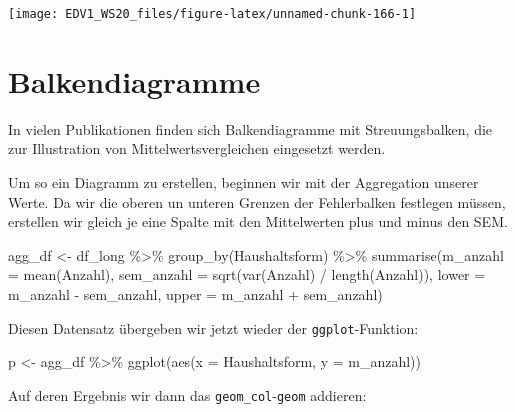 \documentclass[
]{book}
\newenvironment{Shaded}{\begin{snugshade}}{\end{snugshade}}
\newcommand{\AttributeTok}[1]{\textcolor[rgb]{0.77,0.63,0.00}{#1}}
\newcommand{\FunctionTok}[1]{\textcolor[rgb]{0.00,0.00,0.00}{#1}}
\newcommand{\NormalTok}[1]{#1}
\newcommand{\OtherTok}[1]{\textcolor[rgb]{0.56,0.35,0.01}{#1}}
\newcommand{\SpecialCharTok}[1]{\textcolor[rgb]{0.00,0.00,0.00}{#1}}
\begin{document}
\begin{center}\texttt{[image: EDV1\_WS20\_files/figure-latex/unnamed-chunk-166-1]} \end{center}

\hypertarget{balkendiagramme}{%
\section{Balkendiagramme}\label{balkendiagramme}}

In vielen Publikationen finden sich Balkendiagramme mit Streuungsbalken, die zur Illustration von Mittelwertsvergleichen eingesetzt werden.

Um so ein Diagramm zu erstellen, beginnen wir mit der Aggregation unserer Werte. Da wir die oberen un unteren Grenzen der Fehlerbalken festlegen müssen, erstellen wir gleich je eine Spalte mit den Mittelwerten plus und minus den SEM.

\begin{Shaded}
\begin{Highlighting}[]
\NormalTok{agg\_df }\OtherTok{\textless{}{-}}\NormalTok{ df\_long }\SpecialCharTok{\%\textgreater{}\%} 
  \FunctionTok{group\_by}\NormalTok{(Haushaltsform) }\SpecialCharTok{\%\textgreater{}\%} 
  \FunctionTok{summarise}\NormalTok{(}\AttributeTok{m\_anzahl =} \FunctionTok{mean}\NormalTok{(Anzahl),}
            \AttributeTok{sem\_anzahl =} \FunctionTok{sqrt}\NormalTok{(}\FunctionTok{var}\NormalTok{(Anzahl) }\SpecialCharTok{/} \FunctionTok{length}\NormalTok{(Anzahl)),}
            \AttributeTok{lower =}\NormalTok{ m\_anzahl }\SpecialCharTok{{-}}\NormalTok{ sem\_anzahl,}
            \AttributeTok{upper =}\NormalTok{ m\_anzahl }\SpecialCharTok{+}\NormalTok{ sem\_anzahl)}
\end{Highlighting}
\end{Shaded}

Diesen Datensatz übergeben wir jetzt wieder der \texttt{ggplot}-Funktion:

\begin{Shaded}
\begin{Highlighting}[]
\NormalTok{p }\OtherTok{\textless{}{-}}\NormalTok{ agg\_df }\SpecialCharTok{\%\textgreater{}\%} 
  \FunctionTok{ggplot}\NormalTok{(}\FunctionTok{aes}\NormalTok{(}\AttributeTok{x =}\NormalTok{ Haushaltsform,}
             \AttributeTok{y =}\NormalTok{ m\_anzahl))}
\end{Highlighting}
\end{Shaded}

Auf deren Ergebnis wir dann das \texttt{geom\_col}-\texttt{geom} addieren:
\end{document}
